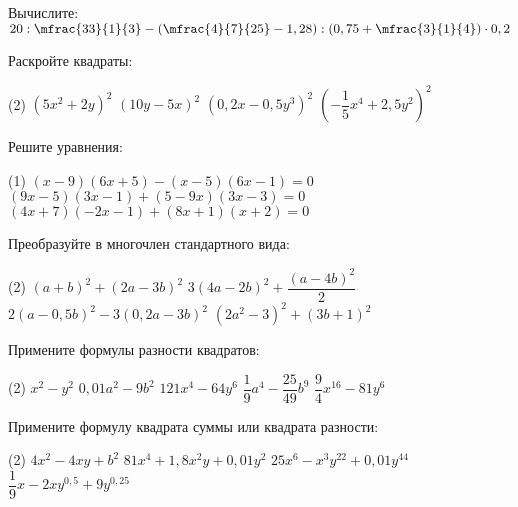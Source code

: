 \begin{exam}
	\begin{listofex}
		\item Вычислите: \( 20 : \mfrac{33}{1}{3} - \left( \mfrac{4}{7}{25} - 1,28 \right) : \left( 0,75 + \mfrac{3}{1}{4} \right) \cdot 0,2 \)
		\item Раскройте квадраты:
		\begin{tasks}(2)
			\task \( (5x^2+2y)^2\)
			\task \( (10y-5x)^2 \)
			\task \( (0,2x-0,5y^3)^2 \)
			\task \( \left(-\dfrac{1}{5}x^4+2,5y^2\right)^2 \)
		\end{tasks}
		\item Решите уравнения:
		\begin{tasks}(1)
			\task \( (x-9)(6x+5)-(x-5)(6x-1)=0 \)
			\task \( (9x-5)(3x-1)+(5-9x)(3x-3)=0 \)
			\task \( (4x+7)(-2x-1)+(8x+1)(x+2)=0 \)
		\end{tasks}
		\item Преобразуйте в многочлен стандартного вида:
		\begin{tasks}(2)
			\task \( (a+b)^2+(2a-3b)^2 \)
			\task \( 3(4a-2b)^2+\dfrac{(a-4b)^2}{2} \)
			\task \( 2(a-0,5b)^2-3(0,2a-3b)^2 \)
			\task \( (2a^2-3)^2+(3b+1)^2 \)
		\end{tasks}
		\item Примените формулы разности квадратов:
		\begin{tasks}(2)
			\task \( x^2-y^2 \)
			\task \( 0,01a^2-9b^2 \)
			\task \( 121x^4-64y^6 \)
			\task \( \dfrac{1}{9}a^4-\dfrac{25}{49}b^9 \)
			\task \( \dfrac{9}{4}x^{16}-81y^6 \)
		\end{tasks}
		\item Примените формулу квадрата суммы или квадрата разности:
		\begin{tasks}(2)
			\task \( 4x^2-4xy+b^2 \)
			\task \( 81x^4+1,8x^2y+0,01y^2 \)
			\task \( 25x^6-x^3y^{22}+0,01y^{44} \)
			\task \( \dfrac{1}{9}x-2xy^{0,5}+9y^{0,25} \)
		\end{tasks}
	\end{listofex}
\end{exam}

